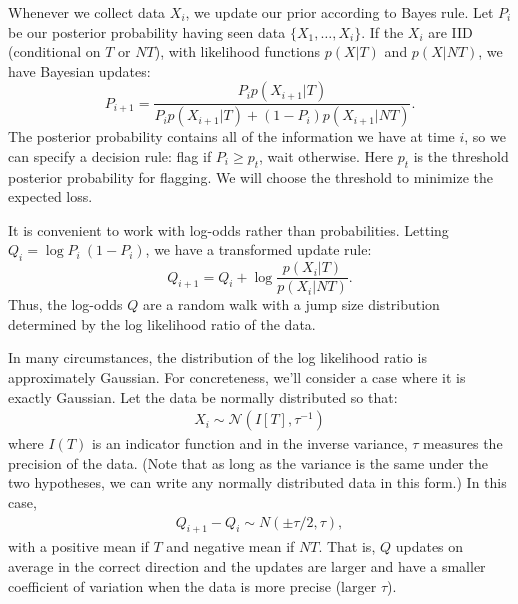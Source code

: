 \documentclass[12pt, letterpaper]{article}
\begin{document}
Whenever we collect data $X_i$, we update our prior according to Bayes rule.
Let $P_i$ be our posterior probability having seen data $\{X_1,\ldots,X_i\}$.
If the $X_i$ are IID (conditional on $T$ or $NT$), with likelihood functions $p(X|T)$ and $p(X|NT)$, we have Bayesian updates:
\begin{equation}
    P_{i+1} = \frac{P_{i} p(X_{i+1}|T)}{P_{i} p(X_{i+1}|T) + (1 - P_{i}) p(X_{i+1}|NT)}.
\end{equation}
The posterior probability contains all of the information we have at time $i$,
so we can specify a decision rule: flag if $P_i \ge p_{t}$, wait otherwise.
Here $p_t$ is the threshold posterior probability for flagging.
We will choose the threshold to minimize the expected loss.

It is convenient to work with log-odds rather than probabilities.
Letting $Q_i = \log P_i \ (1 - P_i)$, we have a transformed update rule:
\begin{equation}
    Q_{i+1} = Q_i + \log \frac{p(X_i | T)}{p(X_i | NT)}.
\end{equation}
Thus, the log-odds $Q$ are a random walk with a jump size distribution determined by the log likelihood ratio of the data.

In many circumstances, the distribution of the log likelihood ratio is approximately Gaussian.
For concreteness, we'll consider a case where it is exactly Gaussian.
Let the data be normally distributed so that:
\begin{align}
    X_i \sim \mathcal{N}(I[T], \tau^{-1})
\end{align}
where $I(T)$ is an indicator function and in the inverse variance, $\tau$ measures the precision of the data.
(Note that as long as the variance is the same under the two hypotheses, we can write any normally distributed data in this form.)
In this case,
\begin{align}
    Q_{i+1} - Q_{i} \sim N(\pm \tau / 2, \tau),
\end{align}
with a positive mean if $T$ and negative mean if $NT$.
That is, $Q$ updates on average in the correct direction and the updates are larger and have a smaller coefficient of variation when the data is more precise (larger $\tau$).
\end{document}
